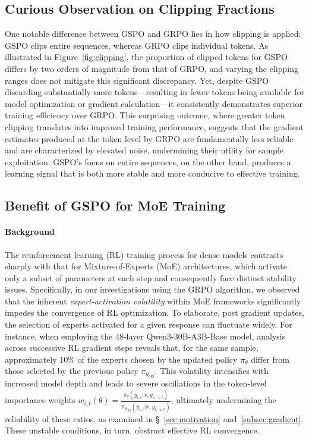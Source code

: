 \subsection{Curious Observation on Clipping Fractions}

One notable difference between GSPO and GRPO lies in how clipping is applied: GSPO clips entire sequences, whereas GRPO clips individual tokens. As illustrated in Figure~\ref{fig:clipping}, the proportion of clipped tokens for GSPO differs by two orders of magnitude from that of GRPO, and varying the clipping ranges does not mitigate this significant discrepancy. Yet, despite GSPO discarding substantially more tokens—resulting in fewer tokens being available for model optimization or gradient calculation—it consistently demonstrates superior training efficiency over GRPO. This surprising outcome, where greater token clipping translates into improved training performance, suggests that the gradient estimates produced at the token level by GRPO are fundamentally less reliable and are characterized by elevated noise, undermining their utility for sample exploitation. GSPO’s focus on entire sequences, on the other hand, produces a learning signal that is both more stable and more conducive to effective training.

\subsection{Benefit of GSPO for MoE Training}
\label{subsec:routing_replay}

\paragraph{Background}
The reinforcement learning (RL) training process for dense models contrasts sharply with that for Mixture-of-Experts (MoE) architectures, which activate only a subset of parameters at each step and consequently face distinct stability issues. Specifically, in our investigations using the GRPO algorithm, we observed that the inherent \textit{expert-activation volatility} within MoE frameworks significantly impedes the convergence of RL optimization. To elaborate, post gradient updates, the selection of experts activated for a given response can fluctuate widely. For instance, when employing the 48-layer Qwen3-30B-A3B-Base model, analysis across successive RL gradient steps reveals that, for the same sample, approximately 10\% of the experts chosen by the updated policy $\pi_{\theta}$ differ from those selected by the previous policy $\pi_{\theta_\text{old}}$. This volatility intensifies with increased model depth and leads to severe oscillations in the token-level importance weights $w_{i,t}(\theta) = \frac{ \pi_{\theta} (y_{i,t} | x, y_{i,<t}) }{ \pi_{\theta_\text{old}} (y_{i,t} | x,y_{i,<t})}$, ultimately undermining the reliability of these ratios, as examined in \S~\ref{sec:motivation} and~\ref{subsec:gradient}. These unstable conditions, in turn, obstruct effective RL convergence.

